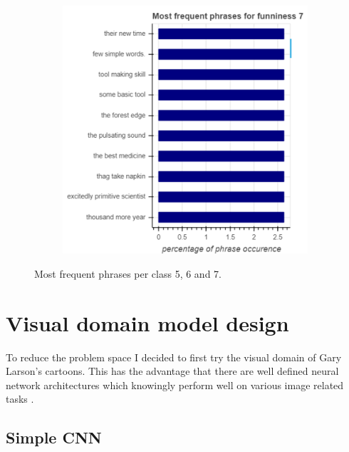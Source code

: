 \documentclass[draft,final,oneside]{vutinfth} %
\begin{document}
\begin{figure}
\begin{subfigure}[b]{0.45\textwidth}
\centering
\includegraphics[width=1.0\textwidth]{graphics/phrases/funniness_7}
\end{subfigure}

\caption{Most frequent phrases per class 5, 6 and 7.}
\label{fig:phraseocc2}

\end{figure}

\fi

\pagebreak

\section{Visual domain model design}

To reduce the problem space I decided to first try the visual domain of Gary Larson's cartoons. This has the advantage that there are well defined neural network architectures which knowingly perform well on various image related tasks \cite{resnet}\cite{alexnet}.

\subsection{Simple CNN}
\end{document}
